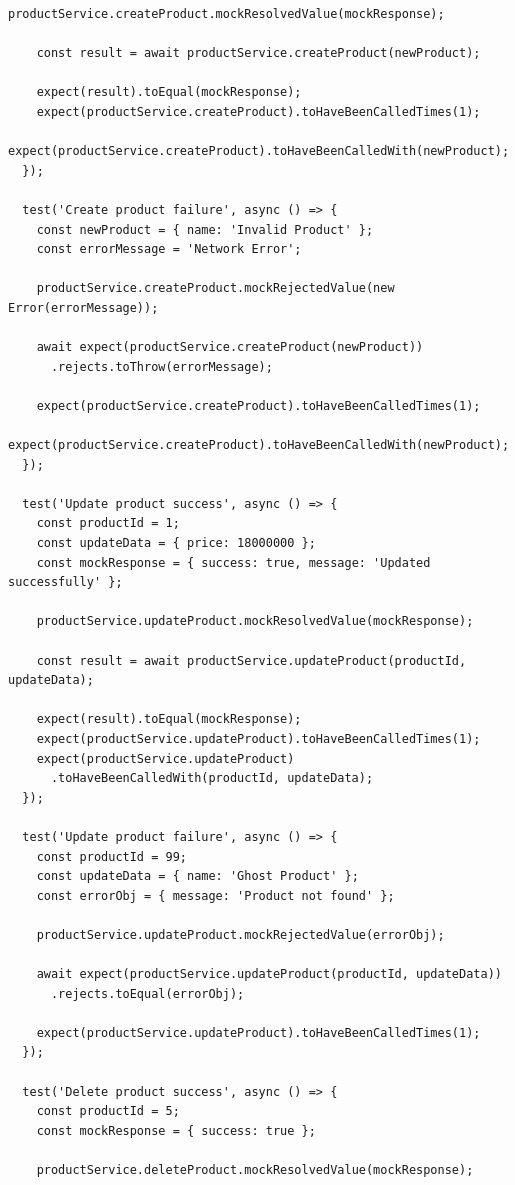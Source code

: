 \begin{lstlisting}[caption=Product Service Mock Test - Frontend]
    productService.createProduct.mockResolvedValue(mockResponse);

    const result = await productService.createProduct(newProduct);

    expect(result).toEqual(mockResponse);
    expect(productService.createProduct).toHaveBeenCalledTimes(1);
    expect(productService.createProduct).toHaveBeenCalledWith(newProduct);
  });

  test('Create product failure', async () => {
    const newProduct = { name: 'Invalid Product' };
    const errorMessage = 'Network Error';
    
    productService.createProduct.mockRejectedValue(new Error(errorMessage));

    await expect(productService.createProduct(newProduct))
      .rejects.toThrow(errorMessage);
    
    expect(productService.createProduct).toHaveBeenCalledTimes(1);
    expect(productService.createProduct).toHaveBeenCalledWith(newProduct);
  });

  test('Update product success', async () => {
    const productId = 1;
    const updateData = { price: 18000000 };
    const mockResponse = { success: true, message: 'Updated successfully' };

    productService.updateProduct.mockResolvedValue(mockResponse);

    const result = await productService.updateProduct(productId, updateData);

    expect(result).toEqual(mockResponse);
    expect(productService.updateProduct).toHaveBeenCalledTimes(1);
    expect(productService.updateProduct)
      .toHaveBeenCalledWith(productId, updateData);
  });

  test('Update product failure', async () => {
    const productId = 99;
    const updateData = { name: 'Ghost Product' };
    const errorObj = { message: 'Product not found' };

    productService.updateProduct.mockRejectedValue(errorObj);

    await expect(productService.updateProduct(productId, updateData))
      .rejects.toEqual(errorObj);

    expect(productService.updateProduct).toHaveBeenCalledTimes(1);
  });

  test('Delete product success', async () => {
    const productId = 5;
    const mockResponse = { success: true };

    productService.deleteProduct.mockResolvedValue(mockResponse);


\end{lstlisting}
